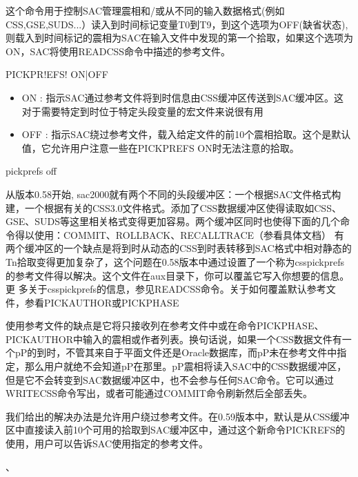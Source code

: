 \label{cmd:pickprefs}

这个命令用于控制SAC管理震相和/或从不同的输入数据格式(例如CSS,GSE,SUDS...）读入到时间标记变量T0到T9，到这个选项为OFF(缺省状态),则载入到时间标记的震相为SAC在输入文件中发现的第一个拾取，如果这个选项为ON，SAC将使用READCSS命令中描述的参考文件。

\begin{SACSTX}
PICKPR!EFS! ON|OFF
\end{SACSTX}

\begin{itemize}
\item ON : 指示SAC通过参考文件将到时信息由CSS缓冲区传送到SAC缓冲区。这对于需要特定到时位于特定头段变量的宏文件来说很有用
\item OFF : 指示SAC绕过参考文件，载入给定文件的前10个震相拾取。这个是默认值，它允许用户注意一些在PICKPREFS ON时无法注意的拾取。 
\end{itemize}

\begin{SACDFT}
pickprefs off
\end{SACDFT}

从版本0.58开始, sac2000就有两个不同的头段缓冲区：一个根据SAC文件格式构建，一个根据有关的CSS3.0文件格式。添加了CSS数据缓冲区使得读取如CSS、GSE、SUDS等这里相关格式变得更加容易。两个缓冲区同时也使得下面的几个命令得以使用：COMMIT、ROLLBACK、RECALLTRACE（参看具体文档）
有两个缓冲区的一个缺点是将到时从动态的CSS到时表转移到SAC格式中相对静态的Tn拾取变得更加复杂了，这个问题在0.58版本中通过设置了一个称为csspickprefs	的参考文件得以解决。这个文件在aux目录下，你可以覆盖它写入你想要的信息。更	多关于csspickprefs的信息，参见READCSS命令。关于如何覆盖默认参考文件，参看PICKAUTHOR或PICKPHASE

使用参考文件的缺点是它将只接收列在参考文件中或在命令PICKPHASE、PICKAUTHOR中输入的震相或作者列表。换句话说，如果一个CSS数据文件有一个pP的到时，不管其来自于平面文件还是Oracle数据库，而pP未在参考文件中指定，那么用户就绝不会知道pP在那里。pP震相将读入SAC中的CSS数据缓冲区，但是它不会转变到SAC数据缓冲区中，也不会参与任何SAC命令。它可以通过WRITECSS命令写出，或者可能通过COMMIT命令刷新然后全部丢失。

我们给出的解决办法是允许用户绕过参考文件。在0.59版本中，默认是从CSS缓冲区中直接读入前10个可用的拾取到SAC缓冲区中，通过这个新命令PICKREFS的使用，用户可以告诉SAC使用指定的参考文件。

、
